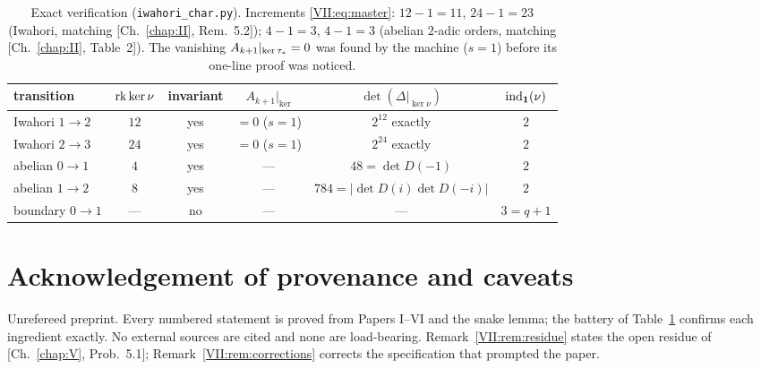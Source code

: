 \begin{table}[ht]
\centering\small
\renewcommand{\arraystretch}{1.2}
\begin{tabular}{lccccc}
\toprule
transition & $\operatorname{rk}\ker\nu$ & invariant & $A_{k+1}|_{\ker}$ &
$\det(\Delta|_{\ker\nu})$ & $\operatorname{ind}_{\mathbf1}(\nu)$\\
\midrule
Iwahori $1\to2$ & $12$ & yes & $=0$ ($s{=}1$) & $2^{12}$ exactly & $2$\\
Iwahori $2\to3$ & $24$ & yes & $=0$ ($s{=}1$) & $2^{24}$ exactly & $2$\\
abelian $0\to1$ & $4$ & yes & --- & $48=\det D(-1)$ & $2$\\
abelian $1\to2$ & $8$ & yes & --- & $784=|\det D(i)\det D(-i)|$ & $2$\\
boundary $0\to1$ & --- & no & --- & --- & $3=q+1$\\
\bottomrule
\end{tabular}
\medskip
\caption{Exact verification (\texttt{iwahori\_char.py}). Increments
\eqref{VII:eq:master}: $12-1=11$, $24-1=23$ (Iwahori, matching [Ch.~\ref{chap:II}, Rem.~5.2]);
$4-1=3$, $4-1=3$ (abelian $2$-adic orders, matching [Ch.~\ref{chap:II}, Table~2]). The vanishing
$A_{k+1}|_{\ker\tau_*}=0$ was found by the machine ($s=1$) before its one-line proof
was noticed.}
\label{VII:tab:battery}
\end{table}

\section*{Acknowledgement of provenance and caveats}

Unrefereed preprint. Every numbered statement is proved from Papers I--VI and the
snake lemma; the battery of Table~\ref{VII:tab:battery} confirms each ingredient
exactly. No external sources are cited and none are load-bearing.
Remark~\ref{VII:rem:residue} states the open residue of [Ch.~\ref{chap:V}, Prob.~5.1];
Remark~\ref{VII:rem:corrections} corrects the specification that prompted the paper.
